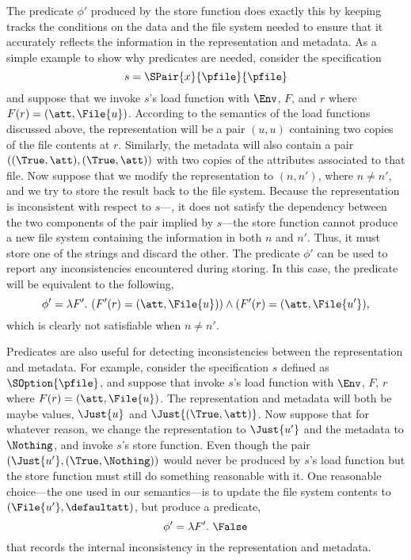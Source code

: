 The predicate $\phi'$ produced by the store function does exactly this
by keeping tracks the conditions on the data and the file system
needed to ensure that it accurately reflects the information in the
representation and metadata. As a simple example to show why
predicates are needed, consider the specification 
%
\[ s = \SPair{x}{\pfile}{\pfile}
\]
% 
and suppose that we invoke $s$'s load function with $\Env$, $F$, and
$r$ where $F(r) = (\att,\File{u})$. According to the semantics of the
load functions discussed above, the representation will be a pair
$(u,u)$ containing two copies of the file contents at $r$. Similarly,
the metadata will also contain a pair $((\True,\att),(\True,\att))$
with two copies of the attributes associated to that file. Now suppose
that we modify the representation to $(n,n')$, where $n \neq n'$, and
we try to store the result back to the file system. Because the
representation is inconsistent with respect to $s$---\ie, it does not
satisfy the dependency between the two components of the pair implied
by $s$---the store function cannot produce a new file system
containing the information in both $n$ and $n'$. Thus, it must store
one of the strings and discard the other. The predicate $\phi'$ can be
used to report any inconsistencies encountered during storing.  In
this case, the predicate will be equivalent to the following,
%
\[
\phi' = \lambda F'.~ (F'(r) = (\att,\File{u})) \wedge (F'(r) = (\att,\File{u'}),
\]
%
which is clearly not satisfiable when $n \not= n'$.

Predicates are also useful for detecting inconsistencies between the
representation and metadata. For example, consider the specification
$s$ defined as $\SOption{\pfile}$, and suppose that invoke $s$'s load
function with $\Env$, $F$, $r$ where $F(r) = (\att,\File{u})$. The
representation and metadata will both be maybe values, $\Just{u}$ and
$\Just{(\True, \att)}$. Now suppose that for whatever reason, we
change the representation to $\Just{u'}$ and the metadata to
$\Nothing$, and invoke $s$'s store function. Even though the pair
$(\Just{u'}, (\True,\Nothing))$ would never be produced by $s$'s load
function but the store function must still do something reasonable
with it. One reasonable choice---the one used in our semantics---is to
update the file system contents to $(\File{u'},\defaultatt)$, but
produce a predicate, 
%
\[
\phi' = \lambda F'.~ \False
\]
%
that records the internal inconsistency in the representation and
metadata.

